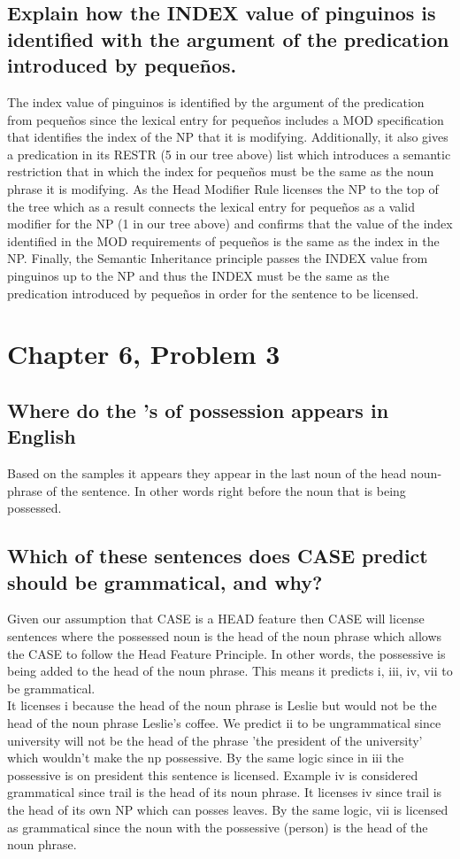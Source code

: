 \documentclass{article}
\begin{document}
\subsection{Explain how the INDEX value of pinguinos is identified with the argument of the predication introduced by pequeños.}
The index value of pinguinos is identified by the argument of the predication from pequeños since the lexical entry for pequeños includes a MOD specification that identifies the index of the NP that it is modifying. Additionally, it also gives a predication in its RESTR ({\@5} in our tree above) list which introduces a semantic restriction that in which the index for pequeños must be the same as the noun phrase it is modifying. As the Head Modifier Rule licenses the NP to the top of the tree which as a result  connects the lexical entry for pequeños as a valid modifier for the NP ({\@1} in our tree above) and confirms that the value of the index identified in the MOD requirements of pequeños is the same as the index in the NP. Finally, the Semantic Inheritance principle passes the INDEX value from pinguinos up to the NP and thus the INDEX must be the same as the predication introduced by pequeños in order for the sentence to be licensed.
\section{Chapter 6, Problem 3}
\subsection{Where do the ’s of possession appears in English}
Based on the samples it appears they appear in the last noun of the head noun-phrase of the sentence. In other words right before the noun that is being possessed. 
\subsection{Which of these sentences does CASE predict should be grammatical, and why?}
Given our assumption that CASE is a HEAD feature then CASE will license sentences where the possessed noun is the head of the noun phrase which allows the CASE to follow the Head Feature Principle. In other words, the possessive is being added to the head of the noun phrase. This means it  predicts i, iii, iv, vii to be grammatical. \\
It licenses i because the head of the noun phrase is Leslie but would not be the head of the noun phrase Leslie's coffee. We predict ii to be ungrammatical since university will not be the head of the phrase 'the president of the university' which wouldn't make the np possessive. By the same logic since in iii the possessive is on president this sentence is licensed. Example iv is considered grammatical since trail is the head of its noun phrase. It licenses iv since trail is the head of its own NP which can posses leaves. By the same logic, vii is licensed as grammatical since the noun with the possessive (person) is the head of the noun phrase. 
\end{document}
